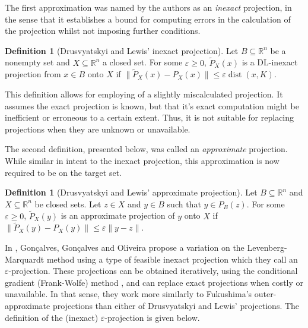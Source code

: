 \documentclass[smallextended,numbook,nospthms]{svjour3}
\theoremstyle{plain}
\theoremstyle{definition}
\newtheorem{definition}[theorem]{Definition}
\def\RR{\mathds R}
\DeclareMathOperator{\dist}{dist}
\begin{document}
The first approximation was named by the authors as an \emph{inexact} projection, in the sense that it establishes a bound for computing errors in the calculation of the projection whilst not imposing further conditions.

\begin{definition}[Drusvyatskyi and Lewis' inexact projection]
	Let $B \subseteq \RR^{n}$ be a nonempty set and $X \subseteq \RR^{n}$ a closed set. For some $\varepsilon \geq 0$, $\tilde{P}_{X}(x)$ is a DL-inexact projection from $x \in B$ onto $X$ if $\|\tilde{P}_{X}(x)-P_{X}(x)\| \leq \varepsilon \dist(x,K)$.
\end{definition}

This definition allows for employing of a slightly miscalculated projection. It assumes the exact projection is known, but that it's exact computation might be inefficient or erroneous to a certain extent. Thus, it is not suitable for replacing projections when they are unknown or unavailable.

The second definition, presented below, was called an \emph{approximate} projection. While similar in intent to the inexact projection, this approximation is now required to be on the target set.

\begin{definition}[Drusvyatskyi and Lewis' approximate projection]
	Let $B \subseteq \RR^{n}$ and $X \subseteq \RR^{n}$ be closed sets. Let $z \in X$ and $y \in B$ such that $y \in P_{B}(z)$. For some $\varepsilon \geq 0$, $\tilde{P}_{X}(y)$ is an approximate projection of $y$ onto $X$ if  $\|\tilde{P}_{X}(y)-P_{X}(y)\| \leq \varepsilon \|y - z\|$.
\end{definition}

In \cite{Goncalves:2019}, Gonçalves, Gonçalves and Oliveira propose a variation on the Levenberg-Marquardt method using a type of feasible inexact projection which they call an $\varepsilon$-projection. These projections can be obtained iteratively, using the conditional gradient (Frank-Wolfe) method \cite{Frank:1956, Jaggi:2013}, and can replace exact projections when costly or unavailable. In that sense, they work more similarly to Fukushima's outer-approximate projections than either of Drusvyatskyi and Lewis' projections. The definition of the (inexact) $\varepsilon$-projection is given below.
\end{document}
